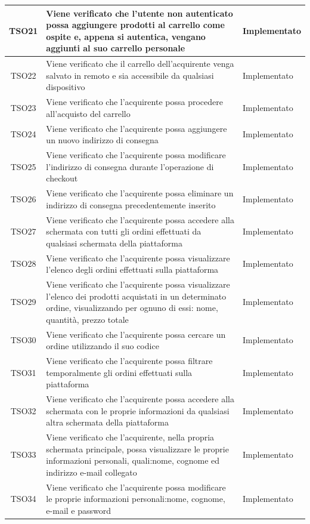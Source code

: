 \begin{longtable}{|c| C{10cm} |C{3cm}|}
	TSO21 & Viene verificato che l'utente non autenticato possa aggiungere prodotti al carrello come ospite e, appena si autentica, vengano aggiunti al suo carrello personale & Implementato\\ \hline
	TSO22 & Viene verificato che il carrello dell'acquirente venga salvato in remoto e sia accessibile da qualsiasi dispositivo & Implementato\\ \hline
   	TSO23 & Viene verificato che l'acquirente possa procedere all'acquisto del carrello & Implementato\\ \hline
   	TSO24 & Viene verificato che l'acquirente possa aggiungere un nuovo indirizzo di consegna & Implementato\\ \hline
   	TSO25 & Viene verificato che l'acquirente possa modificare l'indirizzo di consegna durante l'operazione di checkout & Implementato\\ \hline
	TSO26 & Viene verificato che l'acquirente possa eliminare un indirizzo di consegna precedentemente inserito & Implementato\\ \hline
	TSO27 & Viene verificato che l'acquirente possa accedere alla schermata con tutti gli ordini effettuati da qualsiasi schermata della piattaforma & Implementato \\ \hline
	TSO28 & Viene verificato che l'acquirente possa visualizzare l'elenco degli ordini effettuati sulla piattaforma & Implementato\\ \hline
	TSO29 & Viene verificato che l'acquirente possa visualizzare l'elenco dei prodotti acquistati in un determinato ordine, visualizzando per ognuno di essi: nome, quantità, prezzo totale & Implementato\\ \hline
	TSO30 & Viene verificato che l'acquirente possa cercare un ordine utilizzando il suo codice & Implementato\\ \hline
	TSO31 & Viene verificato che l'acquirente possa filtrare temporalmente gli ordini effettuati sulla piattaforma & Implementato\\ \hline
	TSO32 & Viene verificato che l'acquirente possa accedere alla schermata con le proprie informazioni da qualsiasi altra schermata della piattaforma & Implementato\\ \hline
	TSO33 & Viene verificato che l'acquirente, nella propria schermata principale, possa visualizzare le proprie informazioni personali, quali:nome, cognome ed indirizzo e-mail collegato & Implementato\\ \hline
	TSO34 & Viene verificato che l'acquirente possa modificare le proprie informazioni personali:nome, cognome, e-mail e password & Implementato\\ \hline

\end{longtable}
